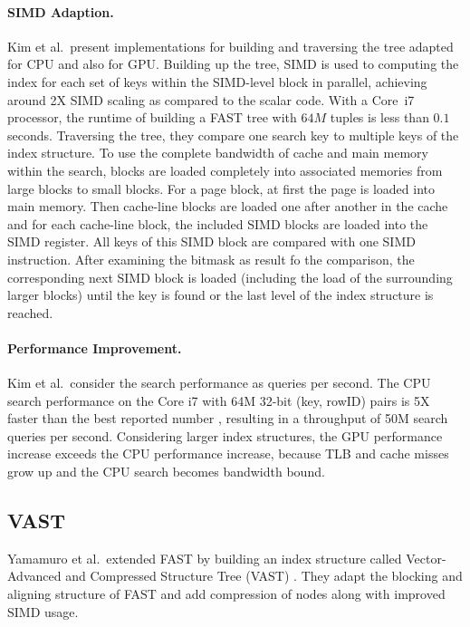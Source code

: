 \documentclass[runningheads,a4paper]{llncs}
\begin{document}
\paragraph{SIMD Adaption.}
Kim et al.\ present implementations for building and traversing the tree adapted for CPU and also for GPU. Building up the tree, SIMD is used to computing the index for each set of keys within the SIMD-level block in parallel, achieving around 2X SIMD scaling as compared to the scalar code. With a Core~i7 processor, the runtime of building a FAST tree with $64M$ tuples is less than $0.1$ seconds. Traversing the tree, they compare one search key to multiple keys of the index structure. To use the complete bandwidth of cache and main memory within the search, blocks are loaded completely into associated memories from large blocks to small blocks. For a page block, at first the page is loaded into main memory. Then cache-line blocks are loaded one after another in the cache and for each cache-line block, the included SIMD blocks are loaded into the SIMD register. All keys of this SIMD block are compared with one SIMD instruction. After examining the bitmask as result fo the comparison, the corresponding next SIMD block is loaded (including the load of the surrounding larger blocks) until the key is found or the last level of the index structure is reached.


\paragraph{Performance Improvement.}
Kim et al.\ consider the search performance as queries per second. The CPU search performance on the Core i7 with 64M 32-bit (key, rowID) pairs is 5X faster than the best reported number \cite{schlegel2009k}, resulting in a throughput of 50M search queries per second. Considering larger index structures, the GPU performance increase exceeds the CPU performance increase, because TLB and cache misses grow up and the CPU search becomes bandwidth bound.

\subsection{VAST}\label{SCM}
Yamamuro et al.\ extended FAST by building an index structure called Vector-Advanced and Compressed Structure Tree (VAST) \cite{yamamuro2012vast}. They adapt the blocking and aligning structure of FAST and add compression of nodes along with improved SIMD usage. %
\end{document}
